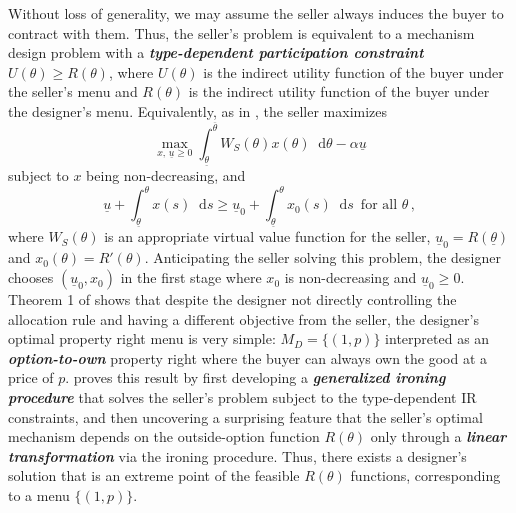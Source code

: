 \documentclass[12pt,letterpaper]{article}
\newenvironment{original}{\color{black}}{}
\theoremstyle{plain}
\theoremstyle{definition}
\theoremstyle{remark}
\renewcommand*\d{\mathop{}\!\mathrm{d}}
\theoremstyle{definition}
\begin{document}
\begin{original}
Without loss of generality, we may assume the seller always induces the buyer to contract with them. Thus, the seller's problem is equivalent to a mechanism design problem with a \textit{\textbf{type-dependent participation constraint}} $U(\theta) \geq R(\theta)$, where $U(\theta)$ is the indirect utility function of the buyer under the seller's menu and $R(\theta)$ is the indirect utility function of the buyer under the designer's menu. Equivalently, as in \citet{DworczakMuir2024}, the seller maximizes
\[\max_{x,\, \underline{u} \geq 0}\int_{\underline{\theta}}^{\overline{\theta}} W_S(\theta) x(\theta) \d \theta - \alpha \underline{u}\]
subject to $x$ being non-decreasing, and
\[\underline{u} + \int_{\underline{\theta}}^{\theta} x(s) \d s \geq \underline{u}_0 + \int_{\underline{\theta}}^{\theta} x_0(s) \d s \, \text{ for all $\theta$}\,,\]
where $W_S(\theta)$ is an appropriate virtual value function for the seller, $\underline{u}_0 = R(\underline{\theta})$ and $x_0(\theta) = R'(\theta)$. Anticipating the seller solving this problem, the designer chooses $(\underline{u}_0, x_0)$ in the first stage where $x_0$ is non-decreasing and $\underline{u}_0 \geq 0$. Theorem 1 of \citet{DworczakMuir2024} shows that despite the designer not directly controlling the allocation rule and having a different objective from the seller, the designer's optimal property right menu is very simple: $M_D = \{(1, p)\}$ interpreted as an \textit{\textbf{option-to-own}} property right where the buyer can always own the good at a price of $p$. \citet{DworczakMuir2024} proves this result by first developing a \textit{\textbf{generalized ironing procedure}} that solves the seller's problem subject to the type-dependent IR constraints, and then uncovering a surprising feature that the seller's optimal mechanism depends on the outside-option function $R(\theta)$ only through a \textit{\textbf{linear transformation}} via the ironing procedure. Thus, there exists a designer's solution that is an extreme point of the feasible $R(\theta)$ functions, corresponding to a menu $\{(1, p)\}$.


\end{original}
\end{document}
